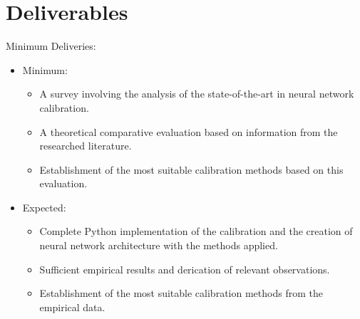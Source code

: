 \documentclass[a4paper]{article}
\begin{document}
\section{Deliverables}
Minimum Deliveries:
\begin{itemize}
\item Minimum:
\begin{itemize}
\item A survey involving the analysis of the state-of-the-art in neural network calibration.
\item A theoretical comparative evaluation based on information from the researched literature.
\item Establishment of the most suitable calibration methods based on this evaluation.
\end{itemize}
\item Expected:
\begin{itemize}
\item Complete Python implementation of the calibration and the creation of neural network architecture with the methods applied.
\item Sufficient empirical results and derication of relevant observations.
\item Establishment of the most suitable calibration methods from the empirical data.
\end{itemize}
\end{itemize}




\end{document}

